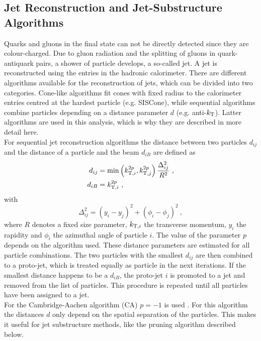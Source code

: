 \subsection{Jet Reconstruction and Jet-Substructure Algorithms}
\label{sec:jetreco}
Quarks and gluons in the final state can not be directly detected since they are colour-charged. Due to gluon radiation and the splitting of gluons in quark-antiquark pairs, a shower of particle develops, a so-called jet. A jet is reconstructed using the entries in the hadronic calorimeter. There are different algorithms available for the reconstruction of jets, which can be divided into two categories. Cone-like algorithms fit cones with fixed radius to the calorimeter entries centred at the hardest particle (e.g. SISCone), while sequential algorithms combine particles depending on a distance parameter $d$ (e.g. anti-$k_{\rm T}$). Latter algorithms are used in this analysis, which is why they are described in more detail here.\\

\noindent For sequential jet reconstruction algorithms the distance between two particles $d_{ij}$ and the distance of a particle and the beam $d_{iB}$ are defined as
\begin{align}
d_{ij} &= \min\left(k_{{\rm T},i}^{2p},k_{{\rm T},j}^{2p}\right)\frac{\Delta_{ij}^2}{R^2} ~, \\
d_{iB} &= k_{{\rm T},i}^{2p} ~,
\end{align}
with
\begin{equation}
\Delta_{ij}^2 = (y_i-y_j)^2 + (\phi_i - \phi_j)^2 ~, \label{eq:reco:deltar}
\end{equation}
where $R$ denotes a fixed size parameter, $k_{{\rm T},i}$ the transverse momentum, $y_i$ the rapidity and $\phi_i$ the azimuthal angle of particle $i$. The value of the parameter $p$ depends on the algorithm used. These distance parameters are estimated for all particle combinations. The two particles with the smallest $d_{ij}$ are then combined to a proto-jet, which is treated equally as particle in the next iterations. If the smallest distance happens to be a $d_{iB}$, the proto-jet $i$ is promoted to a jet and removed from the list of particles. This procedure is repeated until all particles have been assigned to a jet.\\

\noindent For the Cambridge-Aachen algorithm (CA) $p=-1$ is used \cite{CAalgo}. For this algorithm the distances $d$ only depend on the spatial separation of the particles. This makes it useful for jet substructure methods, like the pruning algorithm described below.\\

